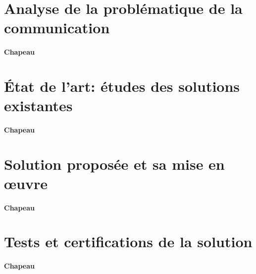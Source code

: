 \section{Analyse de la problématique de la communication} \label{sec:ProblematiqueCommunication}

\paragraph{Chapeau}


\section{État de l’art: études des solutions existantes} \label{sec:etatDeLart1}

\paragraph{Chapeau}


\section{Solution proposée et sa mise en œuvre} \label{sec:solution1}

\paragraph{Chapeau}


\section{Tests et certifications de la solution} \label{sec:test1}

\paragraph{Chapeau}

